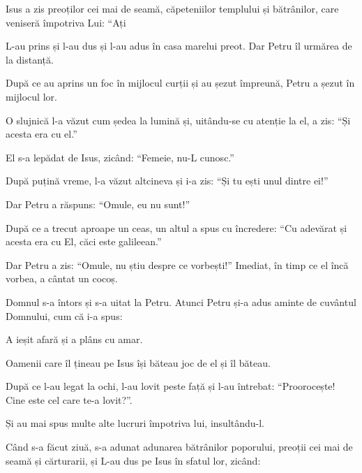 {Isus a zis preoților cei mai de seamă, căpeteniilor templului și bătrânilor, care veniseră împotriva Lui: “Ați
{}



\par }{\PP {}L-au prins și l-au dus și l-au adus în casa marelui preot. Dar Petru îl urmărea de la distanță.

După ce au aprins un foc în mijlocul curții și au șezut împreună, Petru a șezut în mijlocul lor.

O slujnică l-a văzut cum ședea la lumină și, uitându-se cu atenție la el, a zis: “Și acesta era cu el.”


\par }{\PP {}El s-a lepădat de Isus, zicând: “Femeie, nu-L cunosc.”


\par }{\PP {}După puțină vreme, l-a văzut altcineva și i-a zis: “Și tu ești unul dintre ei!”

\par }{\PP Dar Petru a răspuns: “Omule, eu nu sunt!”


\par }{\PP {}După ce a trecut aproape un ceas, un altul a spus cu încredere: “Cu adevărat și acesta era cu El, căci este galileean.”


\par }{\PP {}Dar Petru a zis: “Omule, nu știu despre ce vorbești!” Imediat, în timp ce el încă vorbea, a cântat un cocoș.

Domnul s-a întors și s-a uitat la Petru. Atunci Petru și-a adus aminte de cuvântul Domnului, cum că i-a spus:
{}

A ieșit afară și a plâns cu amar.


\par }{\PP {}Oamenii care îl țineau pe Isus își băteau joc de el și îl băteau.

După ce l-au legat la ochi, l-au lovit peste față și l-au întrebat: “Proorocește! Cine este cel care te-a lovit?”.

Și au mai spus multe alte lucruri împotriva lui, insultându-l.


\par }{\PP {}Când s-a făcut ziuă, s-a adunat adunarea bătrânilor poporului, preoții cei mai de seamă și cărturarii, și L-au dus pe Isus în sfatul lor, zicând:

}
